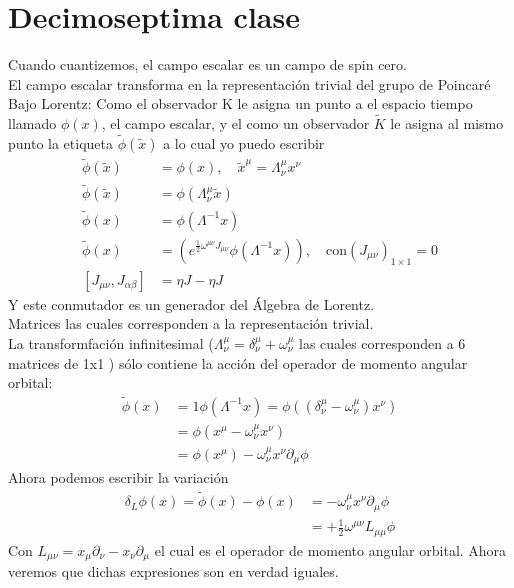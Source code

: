 \documentclass[../main.tex]{subfiles}
\begin{document}
\section{Decimoseptima clase}
Cuando cuantizemos, el campo escalar es un campo de spin cero. \\
El campo escalar transforma en la representación trivial del grupo de Poincaré \\
Bajo Lorentz: Como el observador K le asigna un punto a el espacio tiempo llamado $\phi(x)$, el campo escalar, y el como un observador $\tilde{K}$  le asigna al mismo punto la etiqueta $\tilde{\phi}(\tilde{x})$ a lo cual yo puedo escribir
\begin{align*}
  \tilde{\phi}(\tilde{x})& = \phi(x),\quad \tilde{x}^\mu = \Lambda_\nu^\mu x^\nu \\
  \tilde{\phi}(\tilde{x})& = \phi(\Lambda^\mu_\nu \tilde{x}) \\
  \tilde{\phi}(x)& = \phi(\Lambda^{-1}x) \\
  \tilde{\phi}(x)& = \left( e^{\frac{1}{2}\omega^{\mu \nu}J_{\mu \nu}} \phi(\Lambda^{-1}x)\right) , \quad \text{con} \left( J_{\mu \nu} \right)_{1\times 1} = 0 \\
  \left[J_{\mu \nu},J_{\alpha \beta}\right] &  = \eta J - \eta J 
\end{align*}
Y este conmutador es un generador del Álgebra de Lorentz. \\
Matrices las cuales corresponden a la representación trivial.  \\
La transformfación infinitesimal ($\Lambda^\mu_\nu = \delta^\mu_\nu + \omega^\mu_\nu$ las cuales corresponden a 6 matrices de 1x1 ) sólo contiene la acción del operador de momento angular orbital:
\begin{align*}
  \tilde{\phi}(x) & = 1 \phi(\Lambda^{-1}x) = \phi((\delta_\nu^\mu - \omega^\mu_\nu)x^\nu) \\
  & = \phi(x^\mu - \omega^\mu_\nu x^\nu) \\ 
  & = \phi(x^\mu) - \omega^\mu_\nu x^\nu \partial_\mu \phi 
\end{align*}
Ahora podemos escribir la variación
\begin{align*}
  \delta_L \phi(x) = \tilde{\phi}(x) -\phi(x) & =-\omega^\mu_\nu x^\nu \partial_\mu \phi \\
  & = +\frac{1}{2}\omega^{\mu \nu}L_{\mu \mu}\phi
\end{align*}
Con $L_{\mu \nu} = x_\mu \partial_\nu - x_\nu \partial_\mu$ el cual es el operador de momento angular orbital.  Ahora veremos que dichas expresiones son en verdad iguales.\\
\end{document}
